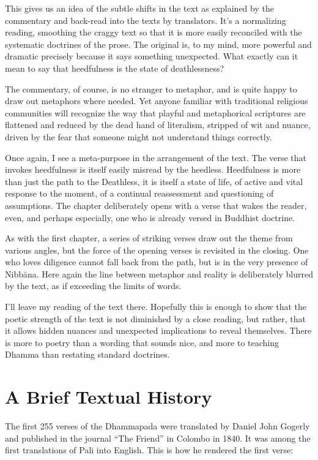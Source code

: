 \documentclass[12pt,openany]{book}%
\begin{document}
This gives us an idea of the subtle shifts in the text as explained by the commentary and back-read into the texts by translators. It’s a normalizing reading, smoothing the craggy text so that it is more easily reconciled with the systematic doctrines of the prose. The original is, to my mind, more powerful and dramatic precisely because it says something unexpected. What exactly can it mean to say that heedfulness is the state of deathlessness?

The commentary, of course, is no stranger to metaphor, and is quite happy to draw out metaphors where needed. Yet anyone familiar with traditional religious communities will recognize the way that playful and metaphorical scriptures are flattened and reduced by the dead hand of literalism, stripped of wit and nuance, driven by the fear that someone might not understand things correctly.

Once again, I see a meta-purpose in the arrangement of the text. The verse that invokes heedfulness is itself easily misread by the heedless. Heedfulness is more than just the path to the Deathless, it is itself a state of life, of active and vital response to the moment, of a continual reassessment and questioning of assumptions. The chapter deliberately opens with a verse that wakes the reader, even, and perhaps especially, one who is already versed in Buddhist doctrine.

As with the first chapter, a series of striking verses draw out the theme from various angles, but the force of the opening verses is revisited in the closing. One who loves diligence cannot fall back from the path, but is in the very presence of \textsanskrit{Nibbāna}. Here again the line between metaphor and reality is deliberately blurred by the text, as if exceeding the limits of words.

I’ll leave my reading of the text there. Hopefully this is enough to show that the poetic strength of the text is not diminished by a close reading, but rather, that it allows hidden nuances and unexpected implications to reveal themselves. There is more to poetry than a wording that sounds nice, and more to teaching Dhamma than restating standard doctrines.

\section*{A Brief Textual History}

The first 255 verses of the Dhammapada were translated by Daniel John Gogerly and published in the journal “The Friend” in Colombo in 1840. It was among the first translations of Pali into English. This is how he rendered the first verse:
\end{document}
